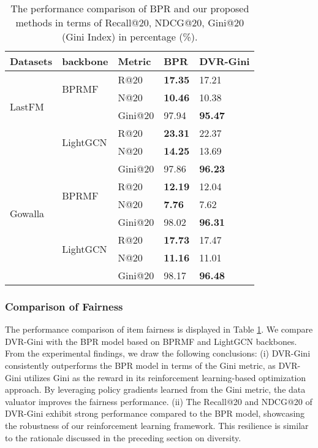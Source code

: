 \begin{table}[t]
\small
\centering
\caption{The performance comparison of BPR and our proposed methods in terms of Recall@20, NDCG@20, Gini@20 (Gini Index) in percentage (\%).}
\label{tab:ItemFairness}
\begin{tabular}{l|l|l|l|l}
\hline
Datasets                  & backbone                  & Metric & BPR & DVR-Gini \\ \hline
\multirow{4}{*}{LastFM} & \multirow{2}{*}{BPRMF}       & R@20  &  \textbf{17.35}&  17.21\\
                            &                           & N@20 &  \textbf{10.46}&  10.38\\
                            &                           & Gini@20  &  97.94&  \textbf{95.47}\\ \cline{2-5} 
                            & \multirow{2}{*}{LightGCN} & R@20  &  \textbf{23.31}&  22.37\\
                            &                           & N@20 &  \textbf{14.25}&  13.69\\
                            &                           & Gini@20  &  97.86&  \textbf{96.23}\\ \hline
\multirow{4}{*}{Gowalla}   & \multirow{2}{*}{BPRMF}       & R@20  &  \textbf{12.19}&  12.04\\
                            &                           & N@20 &  \textbf{7.76}&  7.62\\
                            &                           & Gini@20  &  98.02&  \textbf{96.31}\\ \cline{2-5} 
                            & \multirow{2}{*}{LightGCN} & R@20  &  \textbf{17.73}&  17.47\\
                            &                           & N@20 &  \textbf{11.16}&  11.01\\
                            &                           & Gini@20  &  98.17&   \textbf{96.48}\\ \hline
\end{tabular}
\end{table}

\subsubsection{Comparison of Fairness}
The performance comparison of item fairness is displayed in Table \ref{tab:ItemFairness}. We compare DVR-Gini with the BPR model based on BPRMF and LightGCN backbones. From the experimental findings, we draw the following conclusions: (i) DVR-Gini consistently outperforms the BPR model in terms of the Gini metric, as DVR-Gini utilizes Gini as the reward in its reinforcement learning-based optimization approach. By leveraging policy gradients learned from the Gini metric, the data valuator improves the fairness performance. (ii) The Recall@20 and NDCG@20 of DVR-Gini exhibit strong performance compared to the BPR model, showcasing the robustness of our reinforcement learning framework. This resilience is similar to the rationale discussed in the preceding section on diversity.

